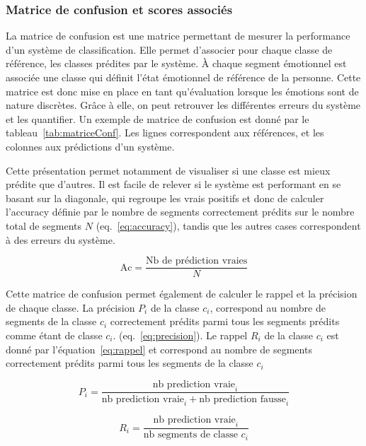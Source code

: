 \subsubsection{Matrice de confusion et scores associés}
La matrice de confusion est une matrice permettant de mesurer la performance d'un système de classification. Elle permet d'associer pour chaque classe de référence, les classes prédites par le système.
À chaque segment émotionnel est associée une classe qui définit l'état émotionnel de référence de la personne. Cette matrice est donc mise en place en tant qu'évaluation lorsque les émotions sont de nature discrètes. Grâce à elle, on peut retrouver les différentes erreurs du système et les quantifier. Un exemple de matrice de confusion est donné par le tableau~\ref{tab:matriceConf}. Les lignes correspondent aux références, et les colonnes aux prédictions d'un système.


%

Cette présentation permet notamment de visualiser si une classe est mieux prédite que d'autres. Il est facile de relever si le système est performant en se basant sur la diagonale, qui regroupe les vrais positifs et donc de calculer l'accuracy définie par le nombre de segments correctement prédits sur le nombre total de segments $N$ (eq.~\ref{eq:accuracy}), tandis que les autres cases correspondent à des erreurs du système.

\begin{equation}
\text{Ac} = \dfrac{\text{Nb de prédiction vraies}}{N}
\end{equation}\label{eq:accuracy}

Cette matrice de confusion permet également de calculer le rappel et la précision de chaque classe. La précision $P_i$ de la classe $c_i$, correspond au nombre de segments de la classe $c_i$ correctement prédits parmi tous les segments prédits comme étant de classe $c_i$. (eq.~\ref{eq:precision}). Le rappel $R_i$ de la classe $c_i$ est donné par l'équation~\ref{eq:rappel} et correspond au nombre de segments correctement prédits parmi tous les segments de la classe $c_i$

\begin{equation}
  P_i = \frac{\text{nb prediction vraie}_i}{\text{nb prediction vraie}_i + \text{nb prediction fausse}_i}
  \label{eq:precision}
\end{equation}

\begin{equation}
  R_i = \frac{\text{nb prediction vraie}_i}{\text{nb segments de classe } c_i}
  \label{eq:rappel}
\end{equation}

